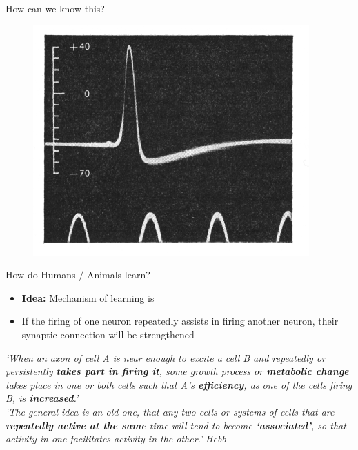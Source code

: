 \begin{frame}{How can we know this?}{}
{\begin{figure}
			\includegraphics[scale=0.3]{10_deep_learning/02_img/spike_potential_squid}
		\end{figure}
	}
\end{frame}


\begin{frame}{How do Humans / Animals learn?}{}
	\footnotesize
	\vspace*{-2mm}
	\begin{itemize}
		\item \textbf{Idea:} Mechanism of learning is 
		\item {} If the firing of one neuron repeatedly assists in firing another neuron,
			their synaptic connection will be strengthened
	\end{itemize}
	
	\begin{boxBlueNoFrame}
		\textit{`When an axon of cell A is near enough to excite a cell B and repeatedly or persistently \textbf{takes part in
			firing it}, some growth process or \textbf{metabolic change} takes place in one or both cells such that
			A's \textbf{efficiency}, as one of the cells firing B, is \textbf{increased}.'} \\[-3mm]

		\textit{`The general idea is an old one, that any two cells or systems of cells that are
			\textbf{repeatedly active at the same} time will tend to become \textbf{`associated'}, so that activity
			in one facilitates activity in the other.'} \hfill \textit{Hebb}
	\end{boxBlueNoFrame}
\end{frame}



